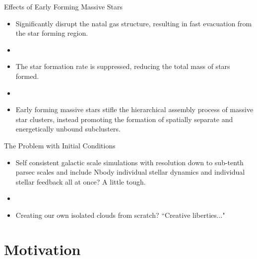 \documentclass[aspectratio=169]{beamer}
\begin{document}
\begin{frame}{Effects of Early Forming Massive Stars}{}
    \begin{itemize}
        \item Significantly disrupt the natal gas structure, resulting in fast evacuation from the star forming region.
        \item []
        \item The star formation rate is suppressed, reducing the total mass of stars formed.
        \item []
        \item Early forming massive stars stifle the hierarchical assembly process of massive star clusters, instead promoting the formation of spatially separate and energetically unbound subclusters.
    \end{itemize}
\end{frame}
%
%
%
%
% 
\begin{frame}{The Problem with Initial Conditions}{}
    \begin{itemize}
        \item Self consistent galactic scale simulations with resolution down to sub-tenth parsec scales and include Nbody individual stellar dynamics and individual stellar feedback all at once? A little tough.
        \item []
        \item Creating our own isolated clouds from scratch? ``Creative liberties..."
    \end{itemize}
\end{frame}
%
%
%
\section{Motivation}
%
%
%
%
%
%
%
\end{document}
